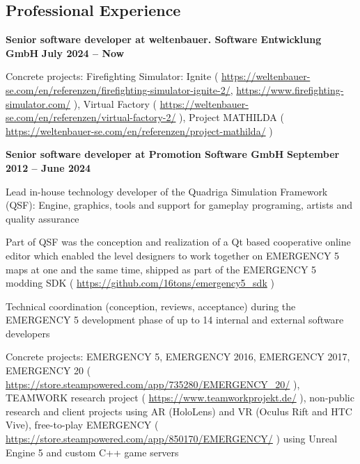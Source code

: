 \documentclass[margin,line]{Ofenberg_Resume}
\begin{document}
\begin{resume}
	\section{\mysidestyle Professional Experience}
	\textbf{Senior software developer at weltenbauer. Software Entwicklung GmbH} \hfill \textbf{July 2024 -- Now}\vspace{-3mm}\\\vspace{-1mm}%
	\begin{list2}
		\item Concrete projects: Firefighting Simulator: Ignite ( \url{https://weltenbauer-se.com/en/referenzen/firefighting-simulator-ignite-2/}, \url{https://www.firefighting-simulator.com/} ), Virtual Factory ( \url{https://weltenbauer-se.com/en/referenzen/virtual-factory-2/} ), Project MATHILDA ( \url{https://weltenbauer-se.com/en/referenzen/project-mathilda/} )
	\end{list2}\vspace{-1.5mm}
	\textbf{Senior software developer at Promotion Software GmbH} \hfill \textbf{September 2012 -- June 2024}\vspace{-3mm}\\\vspace{-1mm}%
	\begin{list2}
		\item Lead in-house technology developer of the Quadriga Simulation Framework (QSF): Engine, graphics, tools and support for gameplay programing, artists and quality assurance
		\item Part of QSF was the conception and realization of a Qt based cooperative online editor which enabled the level designers to work together on EMERGENCY 5 maps at one and the same time, shipped as part of the EMERGENCY 5 modding SDK ( \url{https://github.com/16tons/emergency5_sdk} )
		\item Technical coordination (conception, reviews, acceptance) during the EMERGENCY 5 development phase of up to 14 internal and external software developers
		\item Concrete projects: EMERGENCY 5, EMERGENCY 2016, EMERGENCY 2017, EMERGENCY 20 ( \url{https://store.steampowered.com/app/735280/EMERGENCY_20/} ), TEAMWORK research project ( \url{https://www.teamworkprojekt.de/} ), non-public research and client projects using AR (HoloLens) and VR (Oculus Rift and HTC Vive), free-to-play EMERGENCY ( \url{https://store.steampowered.com/app/850170/EMERGENCY/} ) using Unreal Engine 5 and custom C++ game servers
	\end{list2}\vspace{-1.5mm}

\end{resume}
\end{document}
